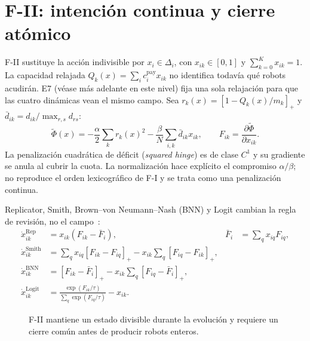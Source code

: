 \clearpage

\section*{F-II: intención continua y cierre atómico}
\enlargethispage{1\baselineskip}

F-II sustituye la acción indivisible por $x_i\in\Delta_i$, con
$x_{ik}\in[0,1]$ y $\sum_{k=0}^{K}x_{ik}=1$. La capacidad relajada
$Q_k(x)=\sum_i c_i^{\mathrm{pay}}x_{ik}$ no identifica todavía qué robots
acudirán. E7 (véase más adelante en este nivel) fija una sola relajación para
que las cuatro dinámicas vean el mismo campo. Sea
$r_k(x)=[1-Q_k(x)/m_k]_+$ y
$\bar d_{ik}=d_{ik}/\max_{r,s}d_{rs}$:
\begin{equation}
\label{eq:n4-smooth-potential}
\widetilde\Phi(x)=
-\frac{\alpha}{2}\sum_k r_k(x)^2
-\frac{\beta}{N}\sum_{i,k}\bar d_{ik}x_{ik},
\qquad
F_{ik}=\frac{\partial\widetilde\Phi}{\partial x_{ik}}.
\end{equation}
La penalización cuadrática de déficit (\emph{squared hinge}) es de clase $C^1$ y
su gradiente se anula al cubrir la cuota. La normalización hace explícito el
compromiso $\alpha/\beta$; no reproduce el
orden lexicográfico de F-I y se trata como una penalización continua.

Replicator, Smith, Brown--von Neumann--Nash (BNN) y Logit cambian la regla de
revisión, no el campo~\parencite{sandholm2010population,quijano2017population}:
\begin{equation}
\label{eq:n4-population-dynamics}
\begin{aligned}
\dot x_{ik}^{\mathrm{Rep}}&=x_{ik}(F_{ik}-\bar F_i),
&\bar F_i&=\sum_qx_{iq}F_{iq},\\[-1mm]
\dot x_{ik}^{\mathrm{Smith}}&=\sum_qx_{iq}[F_{ik}-F_{iq}]_+
-x_{ik}\sum_q[F_{iq}-F_{ik}]_+,\\[-1mm]
\dot x_{ik}^{\mathrm{BNN}}&=[F_{ik}-\bar F_i]_+
-x_{ik}\sum_q[F_{iq}-\bar F_i]_+,\\[-1mm]
\dot x_{ik}^{\mathrm{Logit}}&=
\frac{\exp(F_{ik}/\tau)}{\sum_q\exp(F_{iq}/\tau)}-x_{ik}.
\end{aligned}
\end{equation}

\begin{figure}[H]
\centering

\caption{F-II mantiene un estado divisible durante la evolución y requiere un
cierre común antes de producir robots enteros.}
\label{fig:n4-population-closure}
\viuownsource
\end{figure}

